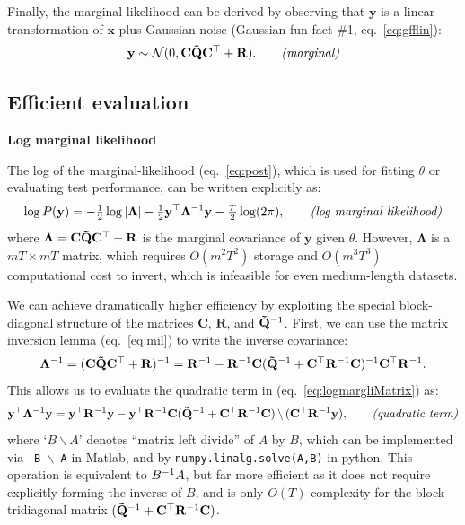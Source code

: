 \documentclass[10pt]{article}
\newcommand{\vx}{\mathbf{x}}
\newcommand{\vy}{\mathbf{y}}
\newcommand{\tmQ}{\mathbf{\tilde Q}}
\newcommand{\mLam}{{\mathbf{\Lambda}}}
\newcommand{\mR}{\mathbf{R}}
\newcommand{\mC}{\mathbf{C}}
\begin{document}
\begin{appendices}
Finally, the marginal likelihood can be derived by observing that
$\vy$ is a linear transformation of $\vx$ plus Gaussian noise
(Gaussian fun fact \#1, eq.~\ref{eq:gfflin}):
\begin{equation}
  \label{eq:margliMatrix}
\vy \sim \Nrm(0,\mC \tmQ  \mC\trp + \mR). \qquad \text{\it (marginal)}
\end{equation}

\subsection{Efficient evaluation}
\label{sec:blocksparseeval}
\textbf{Log marginal likelihood}

The log of the marginal-likelihood (eq.~\ref{eq:post}), which is used for
fitting $\theta$ or evaluating test performance, can be written
explicitly as:
\begin{equation}
  \label{eq:logmargliMatrix}
  \log P(\vy) = -\tonehlf \log | \mLam| - \tonehlf  \vy\trp \mLam\inv
  \vy  - \tfrac{T}{2}\log (2\pi),  \qquad \text{\it (log marginal likelihood)}
\end{equation}
where $\mLam = \mC \tmQ \mC\trp + \mR$ is the marginal covariance of
$\vy$ given $\theta$.  However, $\mLam$ is a $mT \times mT$ matrix,
which requires $O(m^2T^2)$ storage and $O(m^3T^3)$ computational cost
to invert, which is infeasible for even medium-length datasets.

We can achieve dramatically higher efficiency by exploiting the
special block-diagonal structure of the matrices $\mC$, $\mR$, and
$\tmQ\inv$. First, we can use the matrix inversion lemma
(eq.~\ref{eq:mil}) to write the inverse covariance:
\begin{equation}
  \label{eq:3}
  \mLam\inv = (\mC \tmQ \mC\trp + \mR)\inv = \mR\inv - \mR\inv \mC (
  \tmQ\inv + \mC\trp \mR\inv \mC)\inv \mC\trp \mR\inv.
\end{equation}
This allows us to evaluate the quadratic term in (eq.~\ref{eq:logmargliMatrix}) as:
 \begin{equation}
 \vy\trp \mLam\inv \vy =  \vy\trp \mR\inv \vy  -  \vy\trp \mR\inv  \mC (
 \tmQ\inv + \mC\trp \mR\inv \mC)\,  \backslash\,  (\mC\trp \mR\inv \vy),
 \qquad \text{\it (quadratic term)}
 \label{eq:4}
\end{equation}
where `$B \backslash A$' denotes ``matrix left divide'' of $A$ by $B$,
which can be implemented via \texttt{ B $\backslash$ A} in Matlab, and
by \texttt{numpy.linalg.solve(A,B)} in python.  This operation is
equivalent to $B^{-1} A$, but far more efficient as it does not require
explicitly forming the inverse of $B$, and is only $O(T)$ complexity
for the block-tridiagonal matrix $(\tmQ\inv + \mC\trp \mR\inv \mC)$.


\end{appendices}
\end{document}
